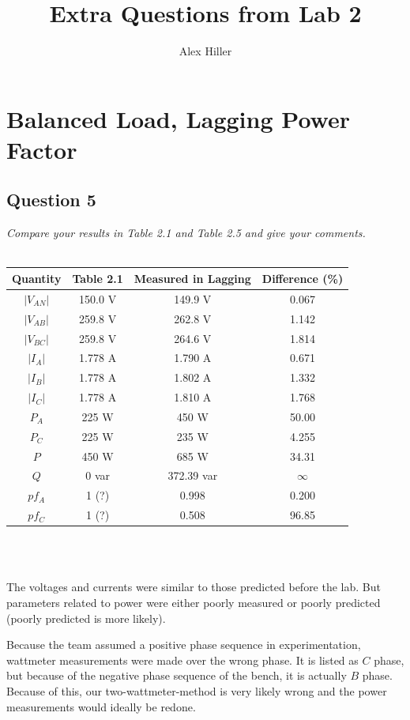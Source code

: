 \documentclass{article}
\author{Alex Hiller}
\title{Extra Questions from Lab 2}
\begin{document}
\maketitle
\clearpage
\tableofcontents
\clearpage
\setlength{\parindent}{0cm}
\setlength{\parskip}{0.125cm}
\section{Balanced Load, Lagging Power Factor}
  \subsection{Question 5}  
  \textit{Compare your results in Table 2.1 and Table 2.5 and give your comments.} \\ \\
  \begin{centering}
  \begin{tabular}{|c|c|c|c|} \hline
    Quantity    & Table 2.1   & Measured in Lagging   & Difference (\%) \\ \hline
    $|V_{AN}|$  & 150.0 V     & 149.9 V               & 0.067     \\ \hline
    $|V_{AB}|$  & 259.8 V     & 262.8 V               & 1.142     \\ \hline
    $|V_{BC}|$  & 259.8 V     & 264.6 V               & 1.814     \\ \hline
    $|I_{A}|$   & 1.778 A     & 1.790 A               & 0.671     \\ \hline
    $|I_{B}|$   & 1.778 A     & 1.802 A               & 1.332     \\ \hline
    $|I_{C}|$   & 1.778 A     & 1.810 A               & 1.768     \\ \hline
    $P_{A}$     & 225 W       & 450 W                 & 50.00     \\ \hline
    $P_{C}$     & 225 W       & 235 W                 & 4.255     \\ \hline
    $P$         & 450 W       & 685 W                 & 34.31     \\ \hline
    $Q$         & 0 var       & 372.39 var            & $\infty$  \\ \hline
    $pf_A$      & 1 (?)       & 0.998                 & 0.200     \\ \hline
    $pf_C$      & 1 (?)       & 0.508                 & 96.85     \\ \hline
  \end{tabular} \\
  \end{centering}
  \noindent \\
  The voltages and currents were similar to those predicted before the lab. But parameters related to power were either poorly measured or poorly predicted (poorly predicted is more likely).\par
  Because the team assumed a positive phase sequence in experimentation, wattmeter measurements were made over the wrong phase. It is listed as $C$ phase, but because of the negative phase sequence of the bench, it is actually $B$ phase. Because of this, our two-wattmeter-method is very likely wrong and the power measurements would ideally be redone.
\end{document}
